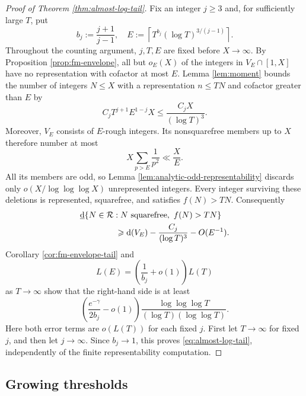 \documentclass[11pt,letterpaper,reqno]{amsart}
\numberwithin{equation}{section}
\theoremstyle{remark}
\newcommand{\Rcal}{\mathcal{R}}
\newcommand{\lowerdens}{\underline{\textup{d}}}
\renewcommand{\leq}{\leqslant}
\renewcommand{\geq}{\geqslant}
\begin{document}
\begin{proof}[Proof of Theorem \ref{thm:almost-log-tail}]
Fix an integer $j\geq3$ and, for sufficiently large $T$, put
\[
 b_j:=\frac{j+1}{j-1},\quad
 E:=\left\lceil T^{b_j}(\log T)^{3/(j-1)}\right\rceil.
\]
Throughout the counting argument, $j,T,E$ are fixed before $X\to\infty$.
By Proposition \ref{prop:fm-envelope}, all but $o_E(X)$ of the integers in
$V_E\cap[1,X]$ have no representation with cofactor at most $E$.
Lemma \ref{lem:moment} bounds the number of integers $N\leq X$ with a representation
$n\leq TN$ and cofactor greater than $E$ by
\[
 C_jT^{j+1}E^{1-j}X\leq\frac{C_jX}{(\log T)^3}.
\]
Moreover, $V_E$ consists of $E$-rough integers. Its nonsquarefree members
up to $X$ therefore number at most
\[
 X\sum_{p>E}\frac1{p^2}\ll\frac XE.
\]
All its members are odd, so Lemma \ref{lem:analytic-odd-representability}
discards only $o(X/\log\log\log X)$ unrepresented integers. Every integer surviving
these deletions is represented, squarefree, and satisfies $f(N)>TN$.
Consequently
\begin{align*}
 &\lowerdens\{N\in\Rcal:N\text{ squarefree},\ f(N)>TN\}\\
 &\hspace{15mm}\geq \textup{d}(V_E)-\frac{C_j}{(\log T)^3}-O(E^{-1}).
\end{align*}
Corollary \ref{cor:fm-envelope-tail} and
\[
 L(E)=\left(\frac1{b_j}+o(1)\right)L(T)
\]
as $T\to\infty$ show that the right-hand side is at least
\[
 \left(\frac{e^{-\gamma}}{2b_j}-o(1)\right)
 \frac{\log\log\log T}{(\log T)(\log\log T)}.
\]
Here both error terms are $o(L(T))$ for each fixed $j$. First let
$T\to\infty$ for fixed $j$, and then let $j\to\infty$. Since $b_j\to1$,
this proves \eqref{eq:almost-log-tail}, independently of the finite
representability computation.
\end{proof}

\subsection{Growing thresholds}
\end{document}
